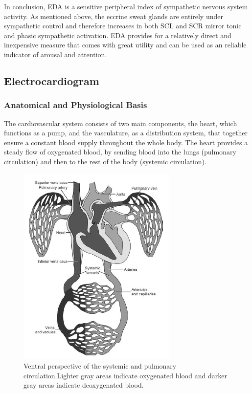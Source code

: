 In conclusion, EDA is a sensitive peripheral index of sympathetic nervous system activity. As mentioned above, the eccrine sweat glands are entirely under sympathetic control and therefore increases in both SCL and SCR mirror tonic and phasic sympathetic activation. EDA provides for a relatively direct and inexpensive measure that comes with great utility and can be used as an reliable indicator of arousal and attention.
\newpage

\subsection{Electrocardiogram}

\subsubsection{Anatomical and Physiological Basis}
The cardiovascular system consists of two main components, the heart, which functions as a pump, and the vasculature, as a distribution system, that together ensure a constant blood supply throughout the whole body. The heart provides a steady flow of oxygenated blood, by sending blood into the lungs (pulmonary circulation) and then to the rest of the body (systemic circulation).

\begin{figure}[ht]
\centering
\includegraphics[width=0.7\textwidth]{images/CVS.png}
\caption{Ventral perspective of the systemic and pulmonary circulation.Lighter gray areas indicate oxygenated blood and darker gray areas indicate deoxygenated blood.\citep{HANDBOOKPP}}
\label{CVSImg}
\end{figure}

